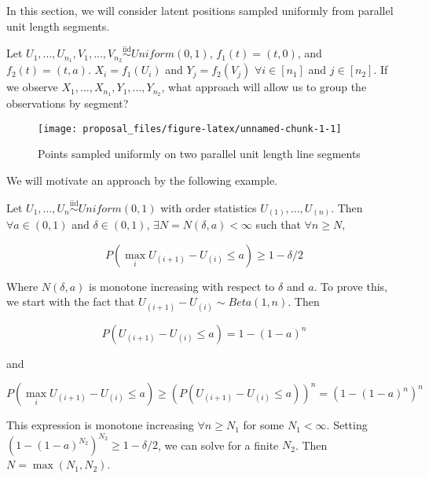 \documentclass[
  11pt,
]{article}
\begin{document}
In this section, we will consider latent positions sampled uniformly
from parallel unit length segments.

\begin{example}
Let $U_1, ..., U_{n_1}, V_1, ..., V_{n_2} \stackrel{\text{iid}}{\sim}Uniform(0, 1)$, $f_1(t) = (t, 0)$, and $f_2(t) = (t, a)$. $X_i = f_1(U_i)$ and $Y_j = f_2(V_j)$ $\forall i \in [n_1]$ and $j \in [n_2]$. If we observe $X_1, ..., X_{n_1}, Y_1, ..., Y_{n_2}$, what approach will allow us to group the observations by segment?
\end{example}

\begin{figure}[H]

{\centering \texttt{[image: proposal\_files/figure-latex/unnamed-chunk-1-1]} 

}

\caption{Points sampled uniformly on two parallel unit length line segments}\label{fig:unnamed-chunk-1}
\end{figure}

We will motivate an approach by the following example.

\begin{example}
Let $U_1, ..., U_n \stackrel{\text{iid}}{\sim}Uniform(0, 1)$ with order statistics 
$U_{(1)}, ..., U_{(n)}$. Then $\forall a \in (0, 1)$ and $\delta \in (0, 1)$, $\exists N = N(\delta, a) < \infty$ such that $\forall n \geq N$, 

\begin{equation}
P(\max_i U_{(i+1)} - U_{(i)} \leq a) \geq 1 - \delta / 2
\end{equation}

Where $N(\delta, a)$ is monotone increasing with respect to $\delta$ and $a$. To prove this, we start with the fact that $U_{(i+1)} - U_{(i)} \sim Beta(1, n)$. Then 

\begin{equation}
P(U_{(i+1)} - U_{(i)} \leq a) = 1 - (1 - a)^n
\end{equation}

and 

\begin{equation}
\label{eq:unsolvable}
P(\max_i U_{(i+1)} - U_{(i)} \leq a) \geq (P(U_{(i+1)} - U_{(i)} \leq a))^n = (1 - (1 - a)^n)^n
\end{equation}

This expression is monotone increasing $\forall n \geq N_1$ for some $N_1 < \infty$. 
Setting $(1 - (1 - a)^{N_2})^{N_2} \geq 1 - \delta / 2$, we can solve for a finite ${N_2}$. Then $N = \max(N_1, N_2)$.
\end{example}
\end{document}
